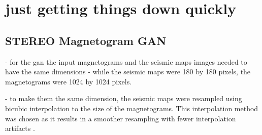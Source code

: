 \documentclass[11pt,a4paper,onecolumn]{report}
\begin{document}
\chapter{just getting things down quickly}



\section{STEREO Magnetogram GAN}
- for the gan the input magnetograms and the seismic maps images needed to have
the same dimensions - while the seismic maps were 180 by 180 pixels, the
magnetograms were 1024 by 1024 pixels.




- to make them the same dimension, the seismic maps were resampled using bicubic
interpolation to the size of the magnetograms. This interpolation method was
chosen as it results in a smoother resampling with fewer interpolation artifacts
\citep{keys_cubic_1981}.
\end{document}
